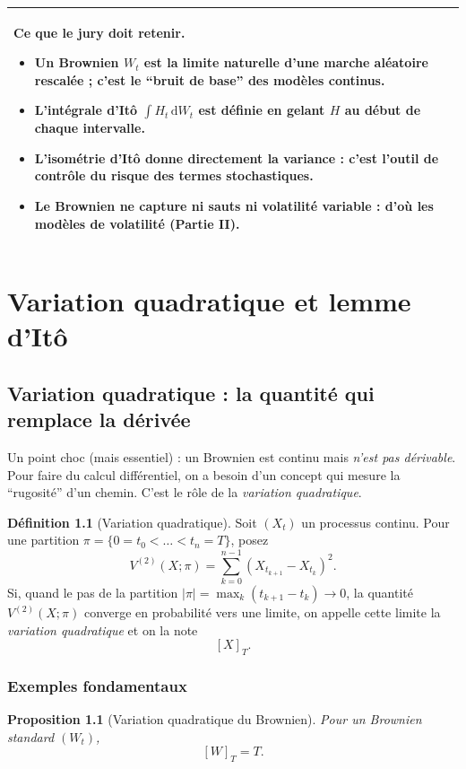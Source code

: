 \documentclass[11pt,a4paper]{report}
\newcommand{\dd}{\mathrm{d}}
\newcommand{\1}{\mathbbm{1}}
\theoremstyle{definition}
\newtheorem{definition}{Définition}[chapter]
\theoremstyle{plain}
\newtheorem{proposition}{Proposition}[chapter]
\theoremstyle{remark}
\newenvironment{jurybox}{%
  \begin{center}
  \setlength{\tabcolsep}{6pt}%
  \renewcommand{\arraystretch}{1.1}%
  \begin{tabular}{|p{0.94\textwidth}|}
  \hline
  \small\textbf{Ce que le jury doit retenir.}\par\medskip
}{%
  \\ \hline
  \end{tabular}
  \end{center}
}
\begin{document}
\begin{jurybox}
\begin{itemize}
\item Un Brownien $W_t$ est la limite naturelle d'une marche aléatoire rescalée ; c'est le ``bruit de base'' des modèles continus.
\item L'intégrale d'Itô $\int H_t\,\dd W_t$ est définie en gelant $H$ au début de chaque intervalle.
\item L'isométrie d'Itô donne directement la variance : c'est l'outil de contrôle du risque des termes stochastiques.
\item Le Brownien ne capture ni sauts ni volatilité variable : d'où les modèles de volatilité (Partie II).
\end{itemize}
\end{jurybox}

\chapter{Variation quadratique et lemme d'Itô}
\label{chap:ito}

\section{Variation quadratique : la quantité qui remplace la dérivée}
\label{sec:qv}

Un point choc (mais essentiel) : un Brownien est continu mais \emph{n'est pas dérivable}.
Pour faire du calcul différentiel, on a besoin d'un concept qui mesure la ``rugosité'' d'un chemin.
C'est le rôle de la \emph{variation quadratique}.

\begin{definition}[Variation quadratique]
Soit $(X_t)$ un processus continu.
Pour une partition $\pi=\{0=t_0<\dots<t_n=T\}$, posez
\[
V^{(2)}(X;\pi)=\sum_{k=0}^{n-1} (X_{t_{k+1}}-X_{t_k})^2.
\]
Si, quand le pas de la partition $|\pi|=\max_k(t_{k+1}-t_k)\to 0$, la quantité $V^{(2)}(X;\pi)$ converge en probabilité vers une limite, on appelle cette limite la \emph{variation quadratique} et on la note
\[
[X]_T.
\]
\end{definition}

\subsection{Exemples fondamentaux}
\begin{proposition}[Variation quadratique du Brownien]
Pour un Brownien standard $(W_t)$,
\[
[W]_T = T.
\]
\end{proposition}
\end{document}
